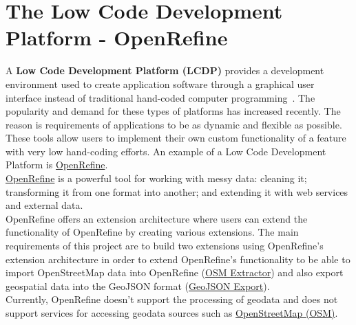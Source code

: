 \section{The Low Code Development Platform - OpenRefine}
A \textbf{Low Code Development Platform (LCDP)} provides a development environment used to create application software through a graphical user interface instead of traditional hand-coded computer programming~\cite{WhatIsLCDP}. The popularity and demand for these types of platforms has increased recently. The reason is requirements of applications to be as dynamic and flexible as possible. These tools allow users to implement their own custom functionality of a feature with very low hand-coding efforts. An example of a Low Code Development Platform is \href{https://openrefine.org/}{OpenRefine}.\\
\linebreak
\href{https://openrefine.org/}{OpenRefine} is a powerful tool for working with messy data: cleaning it; transforming it from one format into another; and extending it with web services and external data.~\cite{AboutOpenRefine}\\
\newline
OpenRefine offers an extension architecture where users can extend the functionality of OpenRefine by creating various extensions.
The main requirements of this project are to build two extensions using OpenRefine's extension architecture in order to extend OpenRefine's functionality to
be able to import OpenStreetMap data into OpenRefine (\hyperref[ch:the-osm-extractor-extension]{OSM Extractor}) and also export geospatial
data into the GeoJSON format (\hyperref[ch:the-geojson-export-extension]{GeoJSON Export}).\\
\newline
Currently, OpenRefine doesn't support the processing of geodata and does not support services for accessing geodata sources such as \href{https://www.openstreetmap.org/}{OpenStreetMap (OSM)}.

\pagebreak
